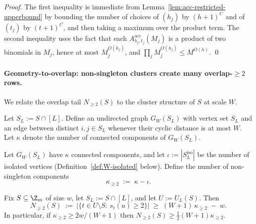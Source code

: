 \begin{proof}
The first inequality is immediate from Lemma~\ref{lem:acc-restricted-upperbound} by bounding the number of choices of
$(h_j)$ by $(h+1)^C$ and of $(t_j)$ by $(t+1)^C$, and then taking a maximum over the product term.
The second inequality uses the fact that each $A^{\mathrm{acc}}_{h_j,t_j}(M_j)$ is a product of two binomials in $M_j$,
hence at most $M_j^{O(h_j)}$, and $\prod_j M_j^{O(h_j)}\le M^{O(h)}$.
\qed
\end{proof}

\paragraph{Geometry-to-overlap: non-singleton clusters create many overlap-$\ge 2$ rows.}
We relate the overlap tail $N_{\ge 2}(S)$ to the cluster structure of $S$ at scale $W$.

\begin{definition}
\label{def:W-proximity-graph}
Let $S_L:=S\cap[L]$. Define an undirected graph $G_W(S_L)$ with vertex set $S_L$ and an edge between distinct
$i,j\in S_L$ whenever their cyclic distance is at most $W$.
Let $\kappa$ denote the number of connected components of $G_W(S_L)$.
\end{definition}

\begin{definition}
\label{def:ns-components}
Let $G_W(S_L)$ have $\kappa$ connected components, and let $\iota:=|S^{\mathrm{iso}}_L|$ be the number of isolated
vertices (Definition~\ref{def:W-isolated} below).
Define the number of non-singleton components
\[
\kappa_{\ge 2} \;:=\; \kappa-\iota.
\]
\end{definition}

\begin{lemma}
\label{lem:overlap2-mass}
Fix $S\subseteq \Z_m$ of size $w$, let $S_L:=S\cap[L]$, and let $U:=U_L(S)$.
Then
\[
N_{\ge 2}(S)
\;:=\;
\big|\{t\in U\setminus S:\ s_t(u)\ge 2\}\big|
\;\ge\;
(W+1)\,\kappa_{\ge 2} \;-\; w.
\]
In particular, if $\kappa_{\ge 2}\ge 2w/(W+1)$ then $N_{\ge 2}(S)\ge \tfrac12 (W+1)\kappa_{\ge 2}$.
\end{lemma}


